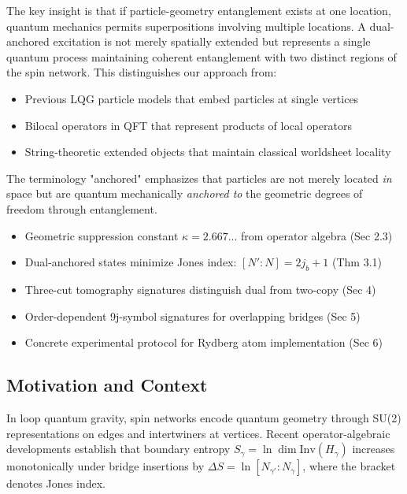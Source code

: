 \documentclass[11pt]{article}
\newcommand{\Inv}{\mathrm{Inv}}
\theoremstyle{plain}
\theoremstyle{definition}
\begin{document}
The key insight is that if particle-geometry entanglement exists at one location, quantum mechanics permits superpositions involving multiple locations. A dual-anchored excitation is not merely spatially extended but represents a single quantum process maintaining coherent entanglement with two distinct regions of the spin network. This distinguishes our approach from:
\begin{itemize}
  \item Previous LQG particle models that embed particles at single vertices
  \item Bilocal operators in QFT that represent products of local operators
  \item String-theoretic extended objects that maintain classical worldsheet locality
\end{itemize}

The terminology "anchored" emphasizes that particles are not merely located \emph{in} space but are quantum mechanically \emph{anchored to} the geometric degrees of freedom through entanglement.

\begin{tcolorbox}[title=Main Results Established in This Paper]
  \begin{itemize}
    \item Geometric suppression constant $\kappa = 2.667...$ from operator algebra (Sec 2.3)
    \item Dual-anchored states minimize Jones index: $[N':N] = 2j_b+1$ (Thm 3.1)
    \item Three-cut tomography signatures distinguish dual from two-copy (Sec 4)
    \item Order-dependent 9j-symbol signatures for overlapping bridges (Sec 5)
    \item Concrete experimental protocol for Rydberg atom implementation (Sec 6)
  \end{itemize}
\end{tcolorbox}

\subsection{Motivation and Context}
In loop quantum gravity, spin networks encode quantum geometry through SU(2) representations on edges and intertwiners at vertices. Recent operator-algebraic developments \cite{bridge-monotonicity,operator-theory} establish that boundary entropy $S_\gamma = \ln\dim\Inv(H_\gamma)$ increases monotonically under bridge insertions by $\Delta S = \ln[N_{\gamma'}:N_\gamma]$, where the bracket denotes Jones index.
\end{document}
